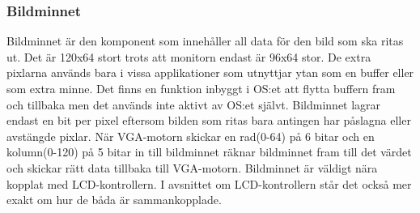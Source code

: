 \documentclass[main.tex]{subfiles}
\begin{document}
\subsubsection{Bildminnet}

Bildminnet är den komponent som innehåller all data för den bild som ska ritas ut. Det är 120x64 stort trots att monitorn endast är 96x64 stor. De extra pixlarna används bara i vissa applikationer som utnyttjar ytan som en buffer eller som extra minne. Det finns en funktion inbyggt i OS:et att flytta buffern fram och tillbaka men det används inte aktivt av OS:et självt. Bildminnet lagrar endast en bit per pixel eftersom bilden som ritas bara antingen har påslagna eller avstängde pixlar.
När VGA-motorn skickar en rad(0-64) på 6 bitar och en kolumn(0-120) på 5 bitar in till bildminnet räknar bildminnet fram till det värdet och skickar rätt data tillbaka till VGA-motorn. Bildminnet är väldigt nära kopplat med LCD-kontrollern. I avsnittet om LCD-kontrollern står det också mer exakt om hur de båda är sammankopplade.
\end{document}
